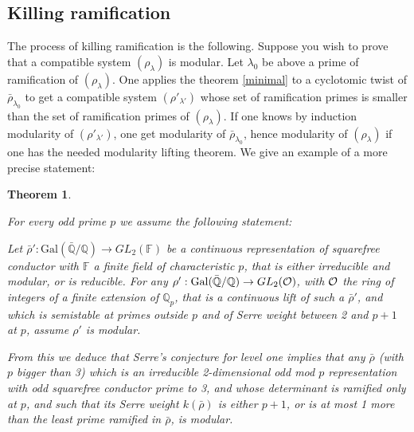 \documentclass[12pt]{article}
\newcommand{\Q}{\mathbb{Q}}
\newcommand{\rhobar}{\overline{\rho}}
\newtheorem{theorem}{Theorem}[section]
\newcommand{\FF}{ {\mathbb F} }
\def\rhobar{ {\bar {\rho} } }
\def\rhob{ {\bar {\rho} } }
\newcommand{\Galois}{\mathrm{Gal}}
\newcommand{\Gal}{\Galois( \bar{ {\mathbb Q}}/{\mathbb Q})}
\begin{document}
\subsection{Killing ramification}

The process of killing ramification is the following.
Suppose you wish to prove that a compatible system
$(\rho _{\lambda })$ is modular. Let $\lambda_0$ be above
a prime of ramification of $(\rho _{\lambda })$. One 
applies the theorem  \ref{minimal} to a cyclotomic twist of
$\rhob _{\lambda_0 }$ to get a compatible system 
$(\rho ' _{\lambda ' })$ whose set of ramification
primes is smaller than the set of ramification primes
of $(\rho _{\lambda })$. If one knows by induction modularity of
$(\rho ' _{\lambda ' })$, one get modularity of 
$\rhob _{\lambda_0 }$, hence modularity of 
$(\rho _{\lambda })$ if one has the needed modularity lifting theorem.
We give an example of a more precise statement:

\begin{theorem}\label{levelone}

For every odd prime $p$ we assume the following statement:


Let $\rhob':\Gal \rightarrow GL_2(\FF)$ be a continuous representation of
squarefree conductor with $\FF$ a finite field of characteristic
 $p$, that is either irreducible and modular, or is reducible.
 For any $\rho':\Gal \rightarrow GL_2({\cal O})$, with ${\cal O}$ the ring
of
integers of a finite extension of $\Q_p$,
 that is a continuous lift of such a $\rhob'$,  and which is semistable at
primes outside $p$ and of Serre
weight between 2 and $p+1$ at $p$, assume $\rho'$ is modular.


From this we deduce that Serre's conjecture for level one implies that
any $\rhobar$ (with $p$ bigger than 3) which
is an irreducible 2-dimensional odd
mod $p$ representation with odd squarefree conductor prime to 3,
and whose determinant is ramified only at $p$, and such that its Serre
weight
$k(\rhobar)$ is either $p+1$, or is at most 1 more than the least prime
ramified
in $\rhobar$, is modular.
\end{theorem}
\end{document}
